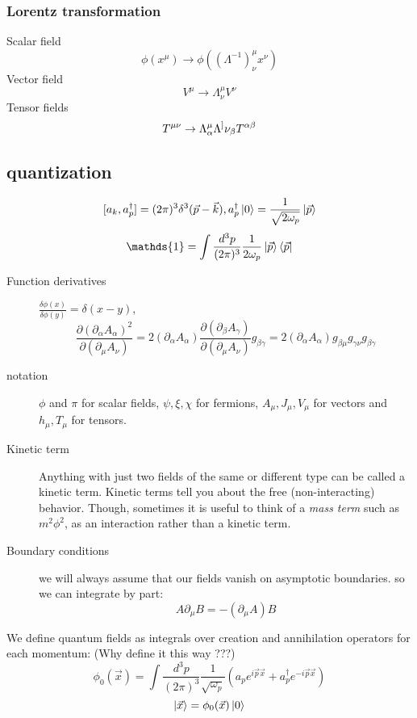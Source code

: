 \subsubsection{Lorentz transformation}
Scalar field
\[
    \phi(x^\mu)\rightarrow\phi((\Lambda^{-1})^\mu_\nu x^\nu)
    \]
Vector field
\[
    V^\mu\rightarrow\Lambda^\mu_\nu V^\nu
    \]
Tensor fields
\[
    T^{\mu\nu}\rightarrow\Lambda^\mu_\alpha\Lambda^]\nu_\beta T^{\alpha\beta}
    \]
\subsection{quantization}
\[ [a_k, a_p^{\dag}] = (2\pi)^{3}\delta^{3}(\vec{p}-\vec{k}), 
a_p^{\dag}\ket{0} = \frac{1}{\sqrt{2\omega_p}}\ket{\vec{p}} \]
\[
    \mathds{1}=\int\frac{d^3p}{(2\pi)^3}\frac{1}{2\omega_p}\ket{\vec{p}}\bra{\vec{p}}
    \]

\begin{description}
    \item [Function derivatives]
	$\frac{\delta \phi(x)}{\delta \phi(y)} = \delta(x-y)$, 
	\[ 
	\frac{\partial(\partial_\alpha A_\alpha)^2}{\partial(\partial_{\mu}A_\nu)}
	=2(\partial_{\alpha}A_\alpha)\frac{\partial(\partial_{\beta}A_\gamma)}{\partial(\partial_{\mu}A_\nu)}g_{\beta\gamma}
	=2(\partial_{\alpha}A_\alpha)g_{\beta\mu}g_{\gamma\nu}g_{\beta\gamma}
	\]
    \item [notation] $\phi$ and $\pi$ for scalar fields, $\psi, \xi,
	\chi$ for fermions, $A_{\mu}, J_{\mu}, V_{\mu}$ for vectors and
	$h_{\mu},T_{\mu}$ for tensors.
    \item [Kinetic term] Anything with just two fields of the same or
	different type can be called a kinetic term. Kinetic terms tell you
	about the free (non-interacting) behavior. Though, sometimes it is useful to
	think of a \emph{mass term} such as $m^2\phi^2$, as an interaction
	rather than a kinetic term.
    \item [Boundary conditions] we will always assume that our fields vanish
	on asymptotic boundaries. so we can integrate by part:
	\emph{\[ A\partial_\mu B = -(\partial_\mu A) B\]}
\end{description}

We define quantum fields as integrals over creation and annihilation
operators for each momentum: (Why define it this way ???)
\begin{equation}
\phi_0(\vec{x}) = \int \frac{d^{3}p}{(2\pi)^3}
\frac{1}{\sqrt{\omega_p}}(a_pe^{i\vec{p}\vec{x}} + a_p^\dag
e^{-i\vec{p}\vec{x}})
    \label{eqn:free_field}
\end{equation}
\[ \ket{\vec{x}} = \phi_0(\vec{x}) \ket{0} \]

